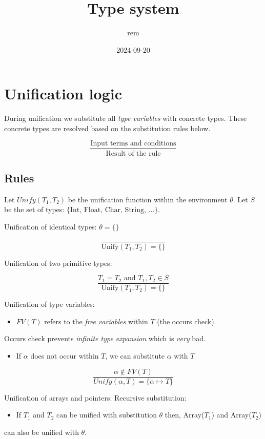 \documentclass[11pt]{article}
\author{rem}
\date{2024-09-20}
\title{Type system}
\begin{document}
\maketitle
\tableofcontents


\section{Unification logic}
\label{sec:org16ca5ba}
During unification we substitute all \emph{type variables} with concrete types.
These concrete types are resolved based on the substitution rules below.

\[
\frac{\text{Input terms and conditions}}{\text{Result of the rule}}
\]

\subsection{Rules}
\label{sec:org4549ea2}
Let \(Unify(T_1,T_2)\) be the unification function within the environment \(\theta\).
Let \(S\) be the set of types: \(\{\text{Int, Float, Char, String, ...}\}\).

Unification of identical types:
\(\theta = \{\}\)

\[
\frac{}{ \text{Unify}(T_1,T_2) = \{\} }
\]

Unification of two primitive types:



\[
\frac{T_1 = T_2 \text{ and } T_1, T_2 \in S}{ \text{Unify}(T_1, T_2) = \{\} }
\]


Unification of type variables:
\begin{itemize}
\item \(FV(T)\) refers to the \emph{free variables} within \(T\) (the occurs check).
\end{itemize}
Occurs check prevents \emph{infinite type expansion} which is \emph{very} bad.
\begin{itemize}
\item If \(\alpha\) does not occur within \(T\), we can substitute \(\alpha\) with \(T\)
\end{itemize}

\[
\frac{\alpha \notin FV(T)}{Unify(\alpha,T) = \{\alpha \mapsto T\}}
\]

Unification of arrays and pointers:
Recursive substitution:
\begin{itemize}
\item If \(T_1\) and \(T_2\) can be unified with substitution \(\theta\) then, Array(\(T_1\)) and Array(\(T_2\))
\end{itemize}
can also be unified with \(\theta\).
\end{document}
